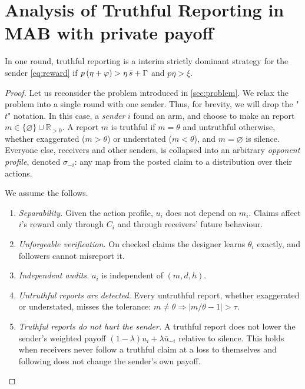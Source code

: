 \section{Analysis of Truthful Reporting in MAB with private payoff}
\label{app:analysis_mab}

\begin{proposition}
  \label{prop:dominance}
  In one round, truthful reporting is a interim strictly dominant strategy for the sender \cref{eq:reward} if $p\,(\eta+\varphi) > \eta\,\bar s+\Gamma$ and $p\eta>\xi$.

\end{proposition}

\begin{proof}
  Let us reconsider the problem introduced in \cref{sec:problem}. We relax the problem into a single round with one sender. Thus, for brevity, we will drop the "$t$" notation. In this case, a \emph{sender} $i$ found an arm, and choose to make an report $m\in\{\varnothing\}\cup\mathbb R_{>0}$. A report $m$ is truthful if $m=\theta$ and untruthful otherwise, whether exaggerated ($m>\theta$) or understated ($m<\theta$), and $m=\varnothing$ is silence. Everyone else, receivers and other senders, is collapsed into an arbitrary \emph{opponent profile}, denoted $\sigma_{-i}$: any map from the posted claim to a distribution over their actions.

We assume the follows.

\begin{enumerate}[label=A\arabic*]
  \item \emph{Separability.} Given the action profile, $u_i$ does not depend on $m_i$. Claims affect $i$'s reward only through $C_i$ and through receivers' future behaviour.
  \item \emph{Unforgeable verification.} On checked claims the designer learns $\theta_i$ exactly, and followers cannot misreport it.
  \item \emph{Independent audits.} $a_i$ is independent of $(m, d, h)$.
  \item \emph{Untruthful reports are detected.} Every untruthful report, whether exaggerated or understated, misses the tolerance: $m\neq\theta \Rightarrow |m/\theta-1|>\tau$.
  \item \emph{Truthful reports do not hurt the sender.} A truthful report does not lower the sender's weighted payoff $(1-\lambda)u_i+\lambda\bar u_{-i}$ relative to silence. This holds when receivers never follow a truthful claim at a loss to themselves and following does not change the sender's own payoff.
\end{enumerate}


\end{proof}
